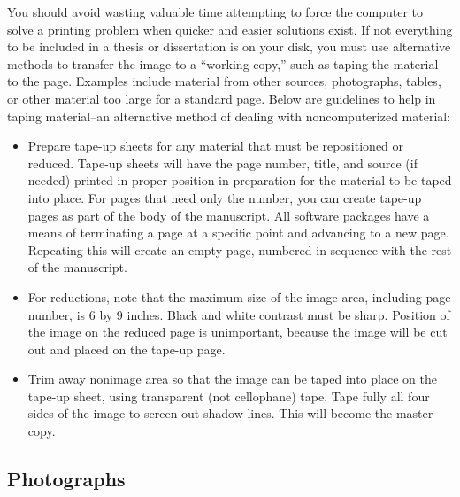 You should avoid wasting valuable time attempting to force the
computer to solve a printing problem when quicker and easier solutions
exist. If not everything to be included in a thesis or dissertation is
on your disk, you must use alternative methods to transfer the image
to a ``working copy,'' such as taping the material to the page.
Examples include material from other sources, photographs, tables, or
other material too large for a standard page. Below are guidelines to
help in taping material--an alternative method of dealing with
noncomputerized material:
\begin{itemize}
\item Prepare tape-up sheets for any material that must be
  repositioned or reduced. Tape-up sheets will have the page number,
  title, and source (if needed) printed in proper position in
  preparation for the material to be taped into place. For pages that
  need only the number, you can create tape-up pages as part of the
  body of the manuscript. All software packages have a means of
  terminating a page at a specific point and advancing to a new page.
  Repeating this will create an empty page, numbered in sequence with
  the rest of the manuscript.
\item For reductions, note that the maximum size of the image area,
  including page number, is 6 by 9 inches. Black and white contrast
  must be sharp. Position of the image on the reduced page is
  unimportant, because the image will be cut out and placed on the
  tape-up page.
\item Trim away nonimage area so that the image can be taped into
  place on the tape-up sheet, using transparent (not cellophane) tape.
  Tape fully all four sides of the image to screen out shadow lines.
  This will become the master copy.
\end{itemize}

\subsection{Photographs}
\label{sec:Photographs}

